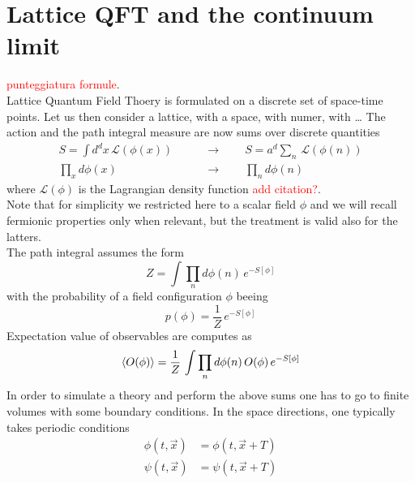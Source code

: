 \section{Lattice QFT and the continuum limit}
\label{sec:lattice_continuum_}
\textcolor{red}{punteggiatura formule}. \\
Lattice Quantum Field Thoery is formulated on a discrete set of space-time points. Let us then consider a lattice, with a space, with numer, with \dots 
The action and the path integral measure are now sums over discrete quantities 
\begin{equation*}
    \begin{aligned}
	    S = \int d^dx \, \mathcal{L}(\phi(x)) \qquad &\to \qquad S = a^d \sum_n \, \mathcal{L}(\phi(n)) \\
        \prod_{x} d\phi(x) \qquad &\to  \qquad \prod_n d\phi(n)
    \end{aligned}
\end{equation*}
where $\mathcal{L}(\phi)$ is the Lagrangian density function \textcolor{red}{add citation?}.  \\
Note that for simplicity we restricted here to a scalar field $\phi$ and we will recall fermionic properties only when relevant, but the treatment is valid also for the latters. \\ 
The path integral assumes the form 
\begin{equation*}
    Z = \int \prod_n d\phi(n) \, e^{-S[\phi]}
\end{equation*}
with the probability of a field configuration $\phi$ beeing 
\begin{equation}
    p(\phi) = \frac{1}{Z} \, e^{-S[\phi]}
    \label{eq:probability_distribution_lattice}
\end{equation}
Expectation value of observables are computes as
\begin{equation}
    \left\langle O(\phi) \right\rangle  = \frac{1}{Z} \, \int \prod_n d\phi(n) \, O(\phi) \, e^{-S[\phi]}
    \label{eq:expectation_value_lattice}
\end{equation}
In order to simulate a theory and perform the above sums one has to go to finite volumes with some boundary conditions. In the space directions, one typically takes periodic conditions 
\begin{equation*}
    \begin{aligned}
        \phi(t, \vec x) &= \phi(t, \vec x + T) \\
        \psi(t, \vec x) &= \psi(t, \vec x + T)
    \end{aligned}
\end{equation*}
